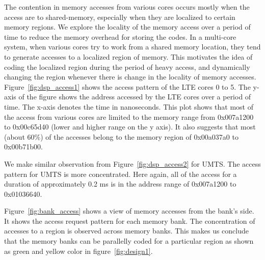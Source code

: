 The contention in memory accesses from various cores occurs mostly when the 
access are to shared-memory, especially when they are localized to certain 
memory regions. We explore the locality of the memory access over a period of 
time to reduce the memory overhead for storing the codes. In a multi-core 
system, when various cores try to work from a shared memory location, they tend 
to generate accesses to a localized region of memory. This motivates the idea of 
coding the localized region during the period of heavy access, and dynamically 
changing the region whenever there is change in the locality of memory accesses.
Figure~\ref{fig:dsp_access1} shows the access pattern of the LTE cores 0 to 5.  
The y-axis of the figure shows the address accessed by the LTE cores over a 
period of time. The x-axis denotes the time in nanoseconds. This plot shows that 
most of the access from various cores are limited to the memory range from 
0x007a1200 to 0x00c65d40 (lower and higher range on the y axis). It also 
suggests that most (about 60$\%$) of the accesses belong to the memory region of 
0x00a037a0 to 0x00b71b00. 

We make similar observation from Figure~\ref{fig:dsp_access2} for UMTS. The 
access pattern for UMTS is more concentrated. Here again, all of the access for 
a duration of approximately 0.2 ms is in the address range of 0x007a1200 to 
0x01036640. 

Figure~\ref{fig:bank_access} shows a view of memory accesses from the bank's 
side. It shows the access request pattern for each memory bank. The 
concentration of accesses to a region is observed across memory banks. This 
makes us conclude that the memory banks can be parallelly coded for a particular 
region as shown as green and yellow color in figure~\ref{fig:design1}. 


